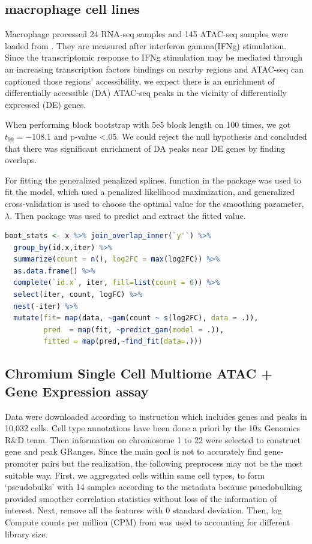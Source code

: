 \documentclass{article}
\begin{document}
\subsection{macrophage cell lines}\label{sec:splines}
Macrophage processed 24 RNA-seq samples and 145 ATAC-seq samples were loaded from \citep{lee2020fluent}. They are measured after interferon gamma(IFNg) stimulation. Since the transcriptomic response to IFNg stimulation may be mediated through an increasing transcription factors bindings on nearby regions and ATAC-seq can captioned those regions' accessibility, we expect there is an enrichment of differentially accessible (DA) ATAC-seq peaks in the vicinity of differentially expressed (DE) genes. 

When performing block bootstrap with 5e5 block length on 100 times, we got $t_{99}=-108.1$ and p-value <.05. We could reject the null hypothesis and concluded that there was significant enrichment of DA peaks near DE genes by finding overlaps.

For fitting the generalized penalized splines,  function in the  package was used to fit the model, which used a penalized likelihood maximization, and generalized cross-validation is used to choose the optimal value for the smoothing parameter, $\lambda$. Then  package was used to predict and extract the fitted value. 

\begin{lstlisting}[language=R]
boot_stats <- x %>% join_overlap_inner(`y'`) %>%
  group_by(id.x,iter) %>%
  summarize(count = n(), log2FC = max(log2FC)) %>%
  as.data.frame() %>%
  complete(`id.x`, iter, fill=list(count = 0)) %>%
  select(iter, count, logFC) %>%
  nest(-iter) %>%
  mutate(fit= map(data, ~gam(count ~ s(log2FC), data = .)),
         pred  = map(fit, ~predict_gam(model = .)),
         fitted = map(pred,~find_fit(data=.)))

\end{lstlisting} 

\subsection{Chromium Single Cell Multiome ATAC + Gene Expression assay}
Data were downloaded according to \citet{Vignette} instruction which includes genes and peaks in 10,032 cells. Cell type annotations have been done a priori by the 10x Genomics R\&D team. Then information on chromosome 1 to 22 were selected to construct gene and peak GRanges. Since the main goal is not to accurately find gene-promoter pairs but the realization, the following preprocess may not be the most suitable way. First, we aggregated cells within same cell types, to form ‘pseudobulks’ with 14 samples according to the metadata because psuedobulking provided smoother correlation statistics without loss of the information of interest. Next, remove all the features with 0 standard deviation. Then, log Compute counts per million (CPM) from  was used to accounting for different library size.
\end{document}
